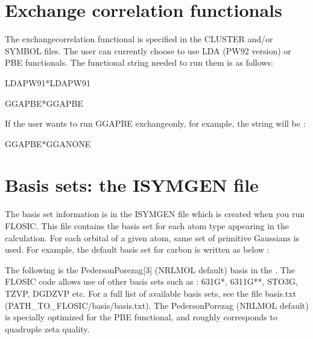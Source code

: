 \documentclass[letterpaper,10pt,english,openany,oneside]{sphinxmanual}
\begin{document}
\sphinxstepscope


\section{Exchange correlation functionals}
\label{\detokenize{docs/Reference/functionals:exchange-correlation-functionals}}\label{\detokenize{docs/Reference/functionals::doc}}
\sphinxAtStartPar
The exchange\sphinxhyphen{}correlation functional is specified in the CLUSTER and/or SYMBOL files. The user can currently choose to use LDA (PW92 version) or PBE functionals. The functional string needed to run them is as follows:

\sphinxAtStartPar
LDA\sphinxhyphen{}PW91*LDA\sphinxhyphen{}PW91

\sphinxAtStartPar
GGA\sphinxhyphen{}PBE*GGA\sphinxhyphen{}PBE

\sphinxAtStartPar
If the user wants to run GGA\sphinxhyphen{}PBE exchange\sphinxhyphen{}only, for example, the string will be :

\sphinxAtStartPar
GGA\sphinxhyphen{}PBE*GGA\sphinxhyphen{}NONE

\sphinxstepscope


\section{Basis sets: the ISYMGEN file}
\label{\detokenize{docs/Reference/isymgen:basis-sets-the-isymgen-file}}\label{\detokenize{docs/Reference/isymgen:usymgen}}\label{\detokenize{docs/Reference/isymgen::doc}}
\sphinxAtStartPar
The basis set information is in the ISYMGEN file which is created when you run FLOSIC.
This file contains the basis set for each atom type appearing in the calculation. For each orbital of a given atom, same set of primitive Gaussians is used. For example, the default basis set for carbon is written as below :

\sphinxAtStartPar
The following is the Pederson\sphinxhyphen{}Porezag{[}3{]} (NRLMOL default) basis in the   .  The FLOSIC code
allows use of other basis sets such as : 6\sphinxhyphen{}31G*, 6\sphinxhyphen{}311G**, STO\sphinxhyphen{}3G, TZVP, DGDZVP etc.
For a full list of available basis sets, see the file basis.txt (PATH\_TO\_FLOSIC/basis/basis.txt).
The Pederson\sphinxhyphen{}Porezag (NRLMOL default) is specially optimized for the PBE functional, and roughly corresponds to quadruple zeta quality.
\end{document}
